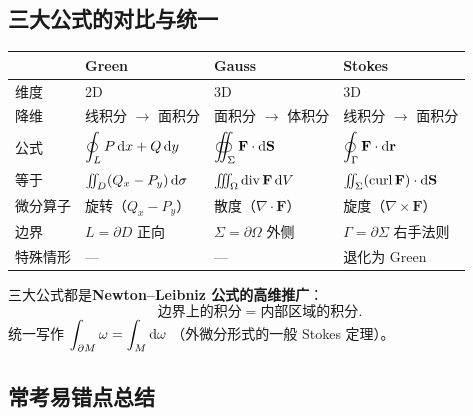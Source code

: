 \documentclass{article}
\DeclareMathOperator{\curl}{curl}
\DeclareMathOperator{\divergence}{div}
\begin{document}
\subsection{三大公式的对比与统一}

\begin{center}
  \renewcommand{\arraystretch}{1.5}
  \begin{tabular}{>{\raggedright\arraybackslash}p{2.5cm}
      >{\raggedright\arraybackslash}p{3.5cm}
      >{\raggedright\arraybackslash}p{3.5cm}
    >{\raggedright\arraybackslash}p{3.5cm}}
    \toprule
    & \textbf{Green} & \textbf{Gauss} & \textbf{Stokes} \\
    \midrule
    维度 & 2D & 3D & 3D \\
    降维 & 线积分 $\to$ 面积分 & 面积分 $\to$ 体积分 & 线积分 $\to$ 面积分 \\
    公式
    & $\displaystyle\oint_L P\,\mathrm{d} x+Q\,\mathrm{d} y$
    & $\displaystyle\oiint_\Sigma \mathbf{F}\cdot\mathrm{d}\mathbf{S}$
    & $\displaystyle\oint_\Gamma \mathbf{F}\cdot\mathrm{d}\mathbf{r}$ \\
    等于
    & $\iint_D (Q_x - P_y)\,\mathrm{d}\sigma$
    & $\iiint_\Omega \divergence\mathbf{F}\,\dif V$
    & $\iint_\Sigma (\curl\mathbf{F})\cdot\dif\mathbf{S}$ \\
    微分算子 & 旋转（$Q_x - P_y$） & 散度（$\nabla\cdot\mathbf{F}$） &
    旋度（$\nabla\times\mathbf{F}$） \\
    边界 & $L = \partial D$ 正向 & $\Sigma = \partial\Omega$ 外侧 & $\Gamma
    = \partial\Sigma$ 右手法则 \\
    特殊情形 & — & — & 退化为 Green \\
    \bottomrule
  \end{tabular}
\end{center}

\begin{remark}[三大公式的统一视角]
  三大公式都是\textbf{Newton--Leibniz 公式的高维推广}：
  \[
    \text{边界上的积分} = \text{内部区域的积分}.
  \]
  统一写作 $\displaystyle\int_{\partial M} \omega = \int_M \mathrm{d}\omega$
  （外微分形式的一般 Stokes 定理）。
\end{remark}

\subsection{常考易错点总结}
\end{document}
